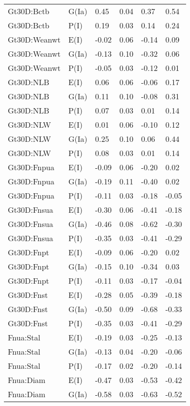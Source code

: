 \begin{center}
\begin{longtable}{|p{1.1in}|p{0.7in}|p{0.7in}|p{0.6in}|p{0.6in}|p{0.6in}|}
  Gt30D:Bctb & G(Ia) & 0.45 & 0.04 & 0.37 & 0.54 \\ 
  Gt30D:Bctb & P(I) & 0.19 & 0.03 & 0.14 & 0.24 \\ 
  Gt30D:Weanwt & E(I) & -0.02 & 0.06 & -0.14 & 0.09 \\ 
  Gt30D:Weanwt & G(Ia) & -0.13 & 0.10 & -0.32 & 0.06 \\ 
  Gt30D:Weanwt & P(I) & -0.05 & 0.03 & -0.12 & 0.01 \\ 
  Gt30D:NLB & E(I) & 0.06 & 0.06 & -0.06 & 0.17 \\ 
  Gt30D:NLB & G(Ia) & 0.11 & 0.10 & -0.08 & 0.31 \\ 
  Gt30D:NLB & P(I) & 0.07 & 0.03 & 0.01 & 0.14 \\ 
  Gt30D:NLW & E(I) & 0.01 & 0.06 & -0.10 & 0.12 \\ 
  Gt30D:NLW & G(Ia) & 0.25 & 0.10 & 0.06 & 0.44 \\ 
  Gt30D:NLW & P(I) & 0.08 & 0.03 & 0.01 & 0.14 \\ 
  Gt30D:Fnpua & E(I) & -0.09 & 0.06 & -0.20 & 0.02 \\ 
  Gt30D:Fnpua & G(Ia) & -0.19 & 0.11 & -0.40 & 0.02 \\ 
  Gt30D:Fnpua & P(I) & -0.11 & 0.03 & -0.18 & -0.05 \\ 
  Gt30D:Fnsua & E(I) & -0.30 & 0.06 & -0.41 & -0.18 \\ 
  Gt30D:Fnsua & G(Ia) & -0.46 & 0.08 & -0.62 & -0.30 \\ 
  Gt30D:Fnsua & P(I) & -0.35 & 0.03 & -0.41 & -0.29 \\ 
  Gt30D:Fnpt & E(I) & -0.09 & 0.06 & -0.20 & 0.02 \\ 
  Gt30D:Fnpt & G(Ia) & -0.15 & 0.10 & -0.34 & 0.03 \\ 
  Gt30D:Fnpt & P(I) & -0.11 & 0.03 & -0.17 & -0.04 \\ 
  Gt30D:Fnst & E(I) & -0.28 & 0.05 & -0.39 & -0.18 \\ 
  Gt30D:Fnst & G(Ia) & -0.50 & 0.09 & -0.68 & -0.33 \\ 
  Gt30D:Fnst & P(I) & -0.35 & 0.03 & -0.41 & -0.29 \\ 
  Fnua:Stal & E(I) & -0.19 & 0.03 & -0.25 & -0.13 \\ 
  Fnua:Stal & G(Ia) & -0.13 & 0.04 & -0.20 & -0.06 \\ 
  Fnua:Stal & P(I) & -0.17 & 0.02 & -0.20 & -0.14 \\ 
  Fnua:Diam & E(I) & -0.47 & 0.03 & -0.53 & -0.42 \\ 
  Fnua:Diam & G(Ia) & -0.58 & 0.03 & -0.63 & -0.52 \\ 

\end{longtable}
\end{center}
